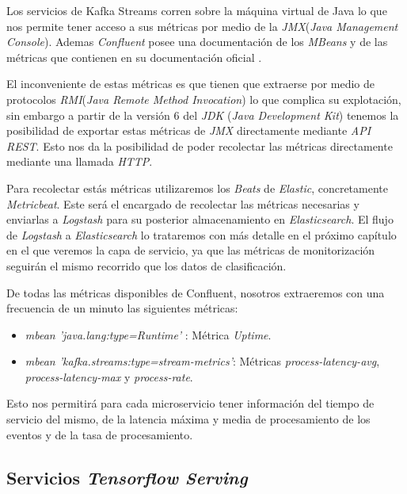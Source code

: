 Los servicios de Kafka Streams corren sobre la máquina virtual de Java lo que nos permite tener acceso a sus métricas por medio de la \textit{JMX}(\textit{Java Management Console}). Ademas \textit{Confluent} posee una documentación de los \textit{MBeans} y de las métricas que contienen en su documentación oficial \cite{Kafka Streamsmonitoring}. 


El inconveniente de estas métricas es que tienen que extraerse por medio de protocolos \textit{RMI}(\textit{Java Remote Method Invocation}) lo que complica su explotación, sin embargo a partir de la versión 6 del \textit{JDK} (\textit{Java Development Kit}) tenemos la posibilidad de exportar estas métricas de \textit{JMX} directamente mediante \textit{API REST}. Esto nos da la posibilidad de poder recolectar las métricas directamente mediante una llamada \textit{HTTP}.

Para recolectar estás métricas utilizaremos los \textit{Beats} de  \textit{Elastic}, concretamente \textit{Metricbeat}. Este será el encargado de recolectar las métricas necesarias y enviarlas a \textit{Logstash} para su posterior almacenamiento en \textit{Elasticsearch}. El flujo de \textit{Logstash} a \textit{Elasticsearch} lo trataremos con más detalle en el próximo capítulo en el que veremos la capa de servicio, ya que las métricas de monitorización seguirán el mismo recorrido que los datos de clasificación. 


De todas las métricas disponibles de Confluent, nosotros extraeremos con una frecuencia de un minuto las siguientes métricas:

\begin{itemize}
	\item \textit{mbean 'java.lang:type=Runtime'} : Métrica \textit{Uptime}.
	
	\item \textit{mbean 'kafka.streams:type=stream-metrics'}: Métricas \textit{process-latency-avg}, \textit{process-latency-max} y \textit{process-rate}.
\end{itemize}



Esto nos permitirá para cada microservicio tener información del tiempo de servicio del mismo, de la latencia máxima y media de procesamiento de los eventos y de la tasa de procesamiento. 





\subsection{Servicios \textit{Tensorflow Serving}}

